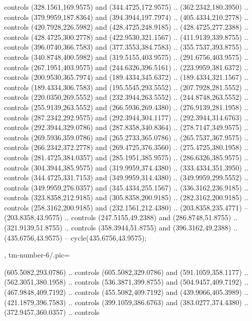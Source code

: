 {{\begin{scope}[y=-0.80pt,x=0.80pt,scale=0.04,yshift=180pt,xshift=-250pt]
      controls (328.1561,169.9575) and (344.4725,172.9575) .. (362.2342,180.3950) ..
      controls (379.9959,187.8364) and (394.3944,197.7974) .. (405.4334,210.2778) ..
      controls (420.7928,226.5982) and (428.4725,248.9185) .. (428.4725,277.2388) ..
      controls (428.4725,300.2778) and (422.9530,321.1567) .. (411.9139,339.8755) ..
      controls (396.0740,366.7583) and (377.3553,384.7583) .. (355.7537,393.8755) ..
      controls (340.8748,400.5982) and (319.5155,403.9575) .. (291.6756,403.9575) ..
      controls (267.1951,403.9575) and (244.6326,396.5161) .. (223.9959,381.6372) ..
      controls (200.9530,365.7974) and (189.4334,345.6372) .. (189.4334,321.1567) ..
      controls (189.4334,306.7583) and (195.5545,293.5552) .. (207.7928,281.5552) ..
      controls (220.0350,269.5552) and (232.3944,263.5552) .. (244.8748,263.5552) ..
      controls (255.9139,263.5552) and (266.5936,269.4380) .. (276.9139,281.1958) ..
      controls (287.2342,292.9575) and (292.3944,304.1177) .. (292.3944,314.6763) ..
      controls (292.3944,329.0786) and (287.8358,340.8364) .. (278.7147,349.9575) ..
      controls (269.5936,359.0786) and (265.2733,365.0786) .. (265.7537,367.9575) ..
      controls (266.2342,372.2778) and (269.4725,376.3560) .. (275.4725,380.1958) ..
      controls (281.4725,384.0357) and (285.1951,385.9575) .. (286.6326,385.9575) ..
      controls (304.3944,385.9575) and (319.9959,374.4380) .. (333.4334,351.3950) ..
      controls (344.4725,331.7153) and (349.9959,314.4380) .. (349.9959,299.5552) ..
      controls (349.9959,276.0357) and (345.4334,255.1567) .. (336.3162,236.9185) ..
      controls (323.8358,212.9185) and (305.8358,200.9185) .. (282.3162,200.9185) ..
      controls (258.3162,200.9185) and (232.1561,212.4380) .. (203.8358,235.4771) --
      (203.8358,43.9575) .. controls (247.5155,49.2388) and (286.8748,51.8755) ..
      (321.9139,51.8755) .. controls (358.3944,51.8755) and (396.3162,49.2388) ..
      (435.6756,43.9575) -- cycle(435.6756,43.9575);
    \end{scope}
  },
  tm-number-6/.pic={
    \begin{scope}[y=-0.80pt,x=0.80pt,scale=0.04,yshift=188pt,xshift=-380pt]
       (605.5082,293.0786) .. controls
      (605.5082,329.0786) and (591.1059,358.1177) .. (562.3051,380.1958) .. controls
      (536.3871,399.8755) and (504.9457,409.7192) .. (467.9848,409.7192) .. controls
      (455.5082,409.7192) and (439.9066,405.3989) .. (421.1879,396.7583) .. controls
      (399.1059,386.6763) and (383.0277,374.4380) .. (372.9457,360.0357) .. controls

\end{scope}}}
